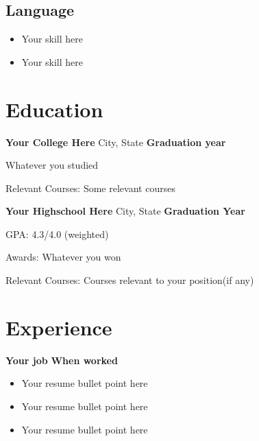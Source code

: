 \documentclass[12pt, letterpaper]{memoir}
\begin{document}
\begin{minipage}[t]{0.3\textwidth}
\subsection{Language}
\begin{itemize}[itemsep=-1mm]
	\item Your skill here
	\item Your skill here
\end{itemize}


\end{minipage}%
\hfill
\begin{minipage}[t]{0.675\textwidth}
\section*{Education}
\vspace{-.5\baselineskip}
\textbf{Your College Here} City, State \hspace*{\fill} \textbf{Graduation year}

Whatever you studied

Relevant Courses: Some relevant courses

\vspace{.4\baselineskip}

\textbf{Your Highschool Here} City, State \hspace*{\fill} \textbf{Graduation Year}

GPA: 4.3/4.0 (weighted)

Awards: Whatever you won

Relevant Courses: Courses relevant to your position(if any)

\vspace{.5\baselineskip}
\section*{Experience}
\vspace{-.5\baselineskip}

\textbf{Your job} \hspace*{\fill} \textbf{When worked}
\vspace{-.2\baselineskip}
\begin{itemize}[itemsep=-1mm]
	\setlength{\itemindent}{-.2in}
	\item Your resume bullet point here
	\item Your resume bullet point here
	\item Your resume bullet point here
\end{itemize}


\end{minipage}
\end{document}

